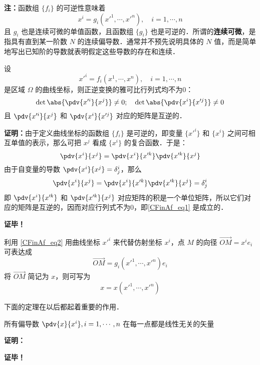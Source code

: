 \textbf{注：}函数组 $\{f_i\}$ 的可逆性意味着
\begin{equation}\label{CFinAf_eq2}
x^i=g_i(x'^1,\cdots,x'^n),\quad i=1,\cdots,n
\end{equation}
且 $g_i$ 也是连续可微的单值函数，且函数组 $\{g_i\}$ 也是可逆的．所谓的\textbf{连续可微}，是指具有直到某一阶数 $N$ 的连续偏导数．通常并不预先说明具体的 $N$ 值，而是简单地写出已知阶的导数就表明假定这些导数的存在和连续．
\begin{theorem}{}
设
\begin{equation}
x'^i=f_i(x^1,\cdots,x^n),\quad i=1,\cdots,n
\end{equation}
是区域 $\Omega$ 的曲线坐标，则正逆变换的雅可比行列式均不为0：
\begin{equation}\label{CFinAf_eq1}
\det\abs{\pdv{x'^i}{x^j}}\neq0;\quad\det\abs{\pdv{x^i}{x'^j}}\neq0
\end{equation}
且 $\pdv{x'^i}{x^j}$ 和 $\pdv{x^i}{x'^j}$ 对应的矩阵是互逆的．
\end{theorem}
\textbf{证明：}由于定义曲线坐标的函数组 $\{f_i\}$ 是可逆的，即变量 $\{x'^i\}$ 和 $\{x^i\}$ 之间可相互单值的表示，那么可把 $x^j$ 看成 $\{x^i\}$ 的复合函数．于是：
\begin{equation}
\pdv{x^i}{x^j}=\pdv{x^i}{x'^k}\pdv{x'^k}{x^j}
\end{equation}
由于自变量的导数 $\pdv{x^i}{x^j}=\delta^i_j$，那么
\begin{equation}
\pdv{x^i}{x^j}=\pdv{x^i}{x'^k}\pdv{x'^k}{x^j}=\delta^i_j
\end{equation}
即 $\pdv{x^i}{x'^k}$ 和 $\pdv{x'^k}{x^j}$ 对应矩阵的积是一个单位矩阵，所以它们对应的矩阵是互逆的，因而对应行列式不为0，即\autoref{CFinAf_eq1} 是成立的．

 
\textbf{证毕！}

利用 \autoref{CFinAf_eq2} 用曲线坐标 $x'^i$ 来代替仿射坐标 $x^i$，点 $M$ 的向径 $\overrightarrow {OM}=x^i e_i$ 可表达成
\begin{equation}\label{CFinAf_eq3}
\overrightarrow{OM}=g_i(x'^1,\cdots,x'^n)e_i
\end{equation}
将 $\overrightarrow{OM}$ 简记为 $x$，则可写为
\begin{equation}
x=x(x'^1,\cdots,x'^n)
\end{equation}

下面的定理在以后都起着重要的作用．
\begin{theorem}{}
所有偏导数 $\pdv{x}{x^i},i=1,\cdots,n$ 在每一点都是线性无关的矢量
\end{theorem}
\textbf{证明：}


\textbf{证毕！}